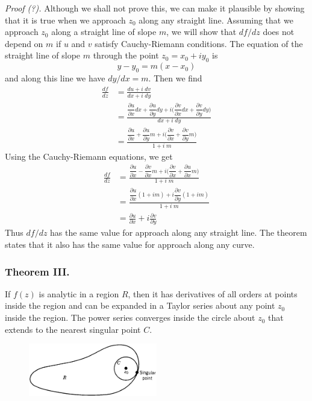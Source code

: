 \documentclass[../main.tex]{subfiles}
\begin{document}
\emph{Proof (?).} Although we shall not prove this, we can make it plausible by showing that it is true when we approach $z_0$ along any straight line. Assuming that we approach $z_0$ along a straight line of slope $m$, we will show that $df /dz$ does not depend on $m$ if $u$ and $v$ satisfy Cauchy-Riemann conditions. The equation of the straight line of slope $m$ through the point $z_0 = x_0 + iy_0$ is
\begin{equation*}
    y - y_0 = m(x - x_0)
\end{equation*}
and along this line we have $dy/dx = m$. Then we find
\begin{align*}
    \frac{df}{dz}&=\frac{du+i\;dv}{dx+i\;dy}\\
    &=\frac{\dfrac{\partial u}{\partial x}dx+\dfrac{\partial u}{\partial y}dy+i\biggl(\dfrac{\partial v}{\partial x}dx+\dfrac{\partial v}{\partial y}dy\biggr)}{dx+i\;dy}\\
    &=\frac{\dfrac{\partial u}{\partial x}+\dfrac{\partial u}{\partial y}m+i\biggl(\dfrac{\partial v}{\partial x}+\dfrac{\partial v}{\partial y}m\biggr)}{1+i\;m}
\end{align*}
Using the Cauchy-Riemann equations, we get
\begin{align*}
    \frac{df}{dz}&=\frac{\dfrac{\partial u}{\partial x}-\dfrac{\partial v}{\partial x}m+i\biggl(\dfrac{\partial v}{\partial x}+\dfrac{\partial u}{\partial x}m\biggr)}{1+i\;m}\\
    &=\frac{\dfrac{\partial u}{\partial x}(1+im)+i\dfrac{\partial v}{\partial y}(1+im)}{1+i\;m}\\
    &=\frac{\partial u}{\partial x}+i\frac{\partial v}{\partial y}
\end{align*}
Thus $df /dz$ has the same value for approach along any straight line. The theorem states that it also has the same value for approach along any curve.

\subsubsection*{Theorem III.} If $f(z)$ is analytic in a region $R$, then it has derivatives of all orders at points inside the region and can be expanded in a Taylor series about any point $z_0$ inside the region. The power series converges inside the circle about $z_0$ that extends to the nearest singular point $C$.
\begin{figure}[h]
    \centering
    \includegraphics[width=0.5\textwidth]{../Rss/Com/Theorem3.png}
\end{figure}
\end{document}
